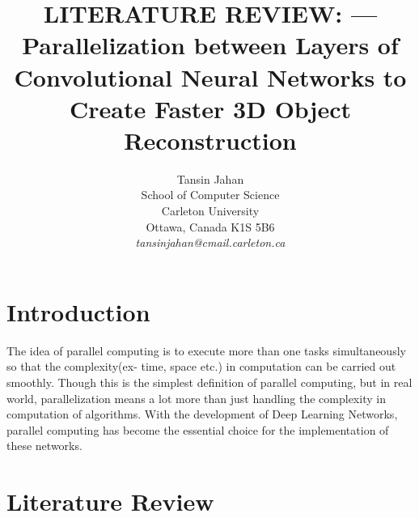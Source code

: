 \documentclass[11pt]{article}       %
\begin{document}


\title{LITERATURE REVIEW: --- Parallelization between Layers of Convolutional Neural Networks to Create Faster 3D Object Reconstruction}


\author{
Tansin Jahan\\
School of Computer Science\\
Carleton University\\
Ottawa, Canada K1S 5B6\\
{\em tansinjahan@cmail.carleton.ca}
} %

\maketitle



\section{Introduction} \label{intro}

The idea of parallel computing is to execute more than one tasks simultaneously so that the complexity(ex- time, space etc.) in computation can be carried out smoothly. Though this is the simplest definition of parallel computing, but in real world, parallelization means a lot more than just handling the complexity in computation of algorithms. With the development of Deep Learning Networks, parallel computing has become the essential choice for the implementation of these networks.    


\section{Literature Review} \label{litrev}
\end{document}
